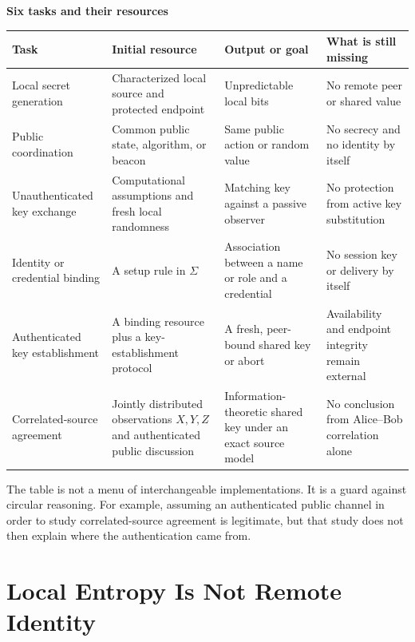 \begin{center}
\centering
\small
\textbf{Six tasks and their resources}\par\medskip
\begin{tabular}{>{\raggedright\arraybackslash}p{}
                >{\raggedright\arraybackslash}p{}
                >{\raggedright\arraybackslash}p{}
                >{\raggedright\arraybackslash}p{}}
\textbf{Task} & \textbf{Initial resource} & \textbf{Output or goal} &
\textbf{What is still missing} \\
\hline
Local secret generation & Characterized local source and protected endpoint &
Unpredictable local bits & No remote peer or shared value \\
\hline
Public coordination & Common public state, algorithm, or beacon & Same public
action or random value & No secrecy and no identity by itself \\
\hline
Unauthenticated key exchange & Computational assumptions and fresh local
randomness & Matching key against a passive observer & No protection from
active key substitution \\
\hline
Identity or credential binding & A setup rule in $\Sigma$ & Association between
a name or role and a credential & No session key or delivery by itself \\
\hline
Authenticated key establishment & A binding resource plus a key-establishment
protocol & A fresh, peer-bound shared key or abort & Availability and endpoint
integrity remain external \\
\hline
Correlated-source agreement & Jointly distributed observations $X,Y,Z$ and
authenticated public discussion & Information-theoretic shared key under an
exact source model & No conclusion from Alice--Bob correlation alone \\
\end{tabular}
\end{center}

The table is not a menu of interchangeable implementations.  It is a guard
against circular reasoning.  For example, assuming an authenticated public
channel in order to study correlated-source agreement is legitimate, but that
study does not then explain where the authentication came from.

\section{Local Entropy Is Not Remote Identity}

